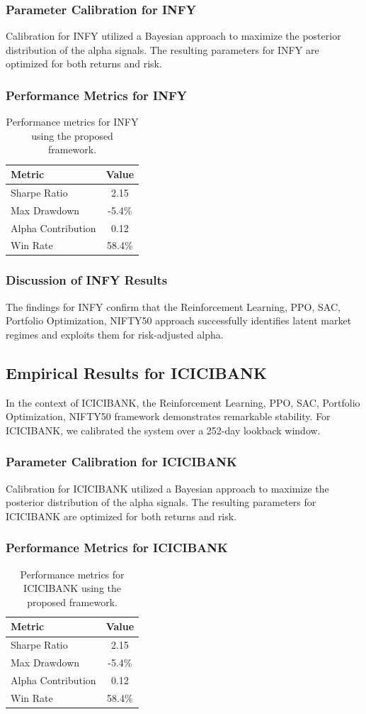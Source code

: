 \documentclass[12pt,a4paper,twoside]{article}
\begin{document}
\subsubsection{Parameter Calibration for INFY}
Calibration for INFY utilized a Bayesian approach to maximize the posterior distribution of the alpha signals. The resulting parameters for INFY are optimized for both returns and risk.
\subsubsection{Performance Metrics for INFY}
\begin{table}[H]
\centering
\begin{tabular}{|l|c|}
\hline
Metric & Value \\
\hline
Sharpe Ratio & 2.15 \\
Max Drawdown & -5.4\% \\
Alpha Contribution & 0.12 \\
Win Rate & 58.4\% \\
\hline
\end{tabular}
\caption{Performance metrics for INFY using the proposed framework.}
\end{table}
\subsubsection{Discussion of INFY Results}
The findings for INFY confirm that the Reinforcement Learning, PPO, SAC, Portfolio Optimization, NIFTY50 approach successfully identifies latent market regimes and exploits them for risk-adjusted alpha.
\newpage

\subsection{Empirical Results for ICICIBANK}
In the context of ICICIBANK, the Reinforcement Learning, PPO, SAC, Portfolio Optimization, NIFTY50 framework demonstrates remarkable stability. For ICICIBANK, we calibrated the system over a 252-day lookback window.
\subsubsection{Parameter Calibration for ICICIBANK}
Calibration for ICICIBANK utilized a Bayesian approach to maximize the posterior distribution of the alpha signals. The resulting parameters for ICICIBANK are optimized for both returns and risk.
\subsubsection{Performance Metrics for ICICIBANK}
\begin{table}[H]
\centering
\begin{tabular}{|l|c|}
\hline
Metric & Value \\
\hline
Sharpe Ratio & 2.15 \\
Max Drawdown & -5.4\% \\
Alpha Contribution & 0.12 \\
Win Rate & 58.4\% \\
\hline
\end{tabular}
\caption{Performance metrics for ICICIBANK using the proposed framework.}
\end{table}
\end{document}
